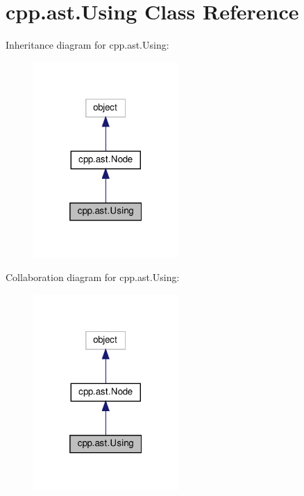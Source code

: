 \hypertarget{classcpp_1_1ast_1_1_using}{}\section{cpp.\+ast.\+Using Class Reference}
\label{classcpp_1_1ast_1_1_using}


Inheritance diagram for cpp.\+ast.\+Using\+:
\nopagebreak
\begin{figure}[H]
\begin{center}
\leavevmode
\includegraphics[width=157pt]{classcpp_1_1ast_1_1_using__inherit__graph}
\end{center}
\end{figure}


Collaboration diagram for cpp.\+ast.\+Using\+:
\nopagebreak
\begin{figure}[H]
\begin{center}
\leavevmode
\includegraphics[width=157pt]{classcpp_1_1ast_1_1_using__coll__graph}
\end{center}
\end{figure}
